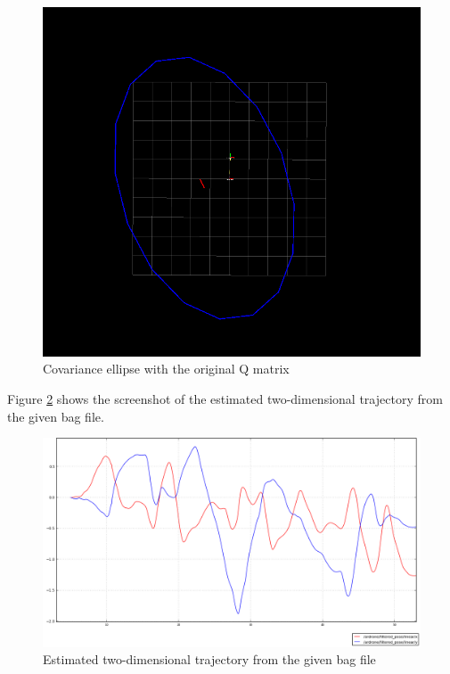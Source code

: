 \documentclass[14pt,a4paper]{article}
\begin{document}
	\begin{figure}[htbp]
	\centering
	\includegraphics[scale=0.5]{Q_origin.png}
  	\caption{Covariance ellipse with the original Q matrix}
    \label{graph:Q_origin}
	\end{figure}
	
	Figure \ref{graph:filtered_pose} shows the screenshot of the estimated two-dimensional trajectory from the given bag file.
	
	\begin{figure}[htbp]
	\centering
	\includegraphics[scale=0.4]{filtered_pose.png}
  	\caption{Estimated two-dimensional trajectory from the given bag file}
    \label{graph:filtered_pose}
	\end{figure}
	
\end{document}
